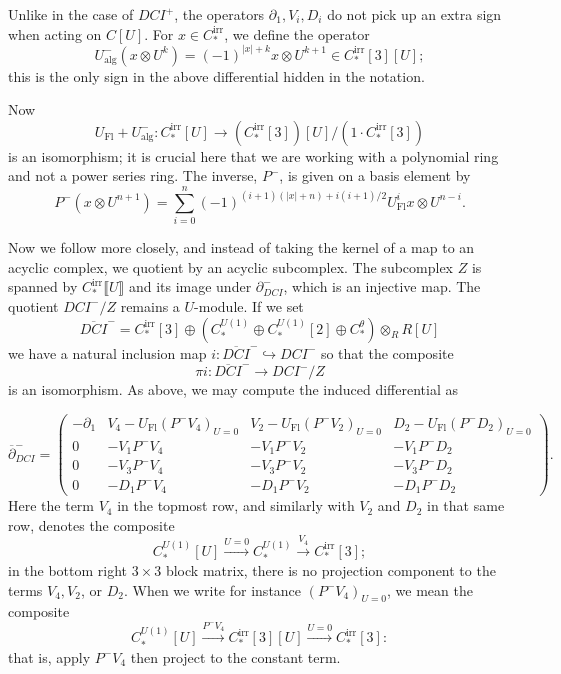 \documentclass{memo-l}
\theoremstyle{definition}
\theoremstyle{remark}
\numberwithin{section}{chapter}
\numberwithin{equation}{chapter}
\begin{document}
Unlike in the case of $DCI^+$, the operators $\partial_1, V_i, D_i$ do not pick up an extra sign when acting on $C[U]$. For $x \in C_*^{\text{irr}}$, we define the operator $$U^-_\text{alg}(x \otimes U^k) = (-1)^{|x| + k} x \otimes U^{k+1} \in C_*^{\text{irr}}[3][U];$$ this is the only sign in the above differential hidden in the notation. 

Now $$U_{\text{Fl}} + U_{\text{alg}}^-: C_*^{\text{irr}}[U] \to \left(C_*^{\text{irr}}[3]\right)[U]\big/(1 \cdot C_*^{\text{irr}}[3])$$ is an isomorphism; it is crucial here that we are working with a polynomial ring and not a power series ring. The inverse, $P^-$, is given on a basis element by $$P^-(x \otimes U^{n+1}) = \sum_{i=0}^n (-1)^{(i+1)(|x|+n)+i(i+1)/2} U_{\text{Fl}}^i x \otimes U^{n-i}.$$

Now we follow \cite{SS-Invol} more closely, and instead of taking the kernel of a map to an acyclic complex, we quotient by an acyclic subcomplex. The subcomplex $Z$ is spanned by $C_*^\text{irr}\llbracket U\rrbracket$ and its image under $\partial_{DCI}^-$, which is an injective map. The quotient $DCI^-/Z$ remains a $U$-module. If we set $$\overline{DCI}^- = C_*^{\text{irr}}[3] \oplus \left(C_*^{U(1)} \oplus C_*^{U(1)}[2] \oplus C_*^\theta\right) \otimes_R R[U]$$ we have a natural inclusion map $i: \overline{DCI}^- \hookrightarrow DCI^-$ so that the composite $$\pi i: \overline{DCI}^- \to DCI^-/Z$$ is an isomorphism. As above, we may compute the induced differential as

$$\overline{\partial}^-_{DCI} = \begin{pmatrix}-\partial_1 & V_4 - U_\text{Fl} \left(P^- V_4\right)_{U = 0} & V_2 - U_\text{Fl} \left(P^- V_2\right)_{U = 0} & D_2 - U_\text{Fl} \left(P^- D_2\right)_{U = 0}\\ 
0 & -V_1P^-V_4 & -V_1P^-V_2 & -V_1P^-D_2\\ 
0 & -V_3P^-V_4 & -V_3P^-V_2 & -V_3P^-D_2\\ 
0 & -D_1P^-V_4 & -D_1P^-V_2 & -D_1P^-D_2\end{pmatrix}.$$ 
Here the term $V_4$ in the topmost row, and similarly with $V_2$ and $D_2$ in that same row, denotes the composite $$C_*^{U(1)}[U] \xrightarrow{U = 0} C_*^{U(1)} \xrightarrow{V_4} C_*^{\text{irr}}[3];$$ in the bottom right $3 \times 3$ block matrix, there is no projection component to the terms $V_4, V_2$, or $D_2$. When we write for instance $(P^- V_4)_{U = 0}$, we mean the composite $$C_*^{U(1)}[U] \xrightarrow{P^- V_4} C_*^{\text{irr}}[3][U] \xrightarrow{U = 0} C_*^{\text{irr}}[3]:$$ that is, apply $P^-V_4$ then project to the constant term. 
\end{document}
